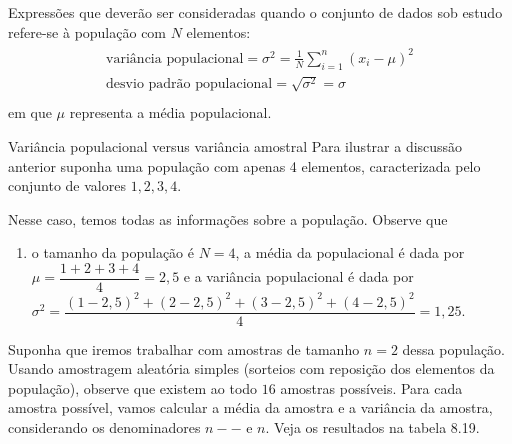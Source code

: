 {{{Expressões que deverão ser consideradas quando o conjunto de dados sob estudo refere-se à população com \(N\) elementos:
\begin{align*}\!\begin{aligned}
\text{variância populacional} = \sigma^2=\frac{1}{N}\sum^n_{i=1}(x_i-\mu)^2\\
\text{desvio padrão populacional}=\sqrt{\sigma^2}=\sigma\\
\end{aligned}\end{align*}
em que \(\mu\) representa a média populacional.


\needspace{.25\textheight}
\begin{example}{Variância populacional versus variância amostral}
Para ilustrar a discussão anterior suponha uma população com apenas 4 elementos, caracterizada pelo conjunto de valores ${1,2,3,4}$.

Nesse caso, temos todas as informações sobre a população. Observe que

\begin{enumerate}
\item o tamanho da população é $N=4$,
a média da populacional é dada por $\mu=\dfrac{1+2+3+4}{4}=2,5$ e
a variância populacional é dada por $\sigma^2=\dfrac{(1-2{,}5)^2+(2-2{,}5)^2+(3-2{,}5)^2+(4-2{,}5)^2}{4}=1{,}25$.
\end{enumerate}

Suponha que iremos trabalhar com amostras de tamanho $n=2$ dessa população. Usando amostragem aleatória simples (sorteios com reposição dos elementos da população), observe que existem ao todo $16$ amostras possíveis. Para cada amostra possível, vamos calcular a média da amostra e a variância da amostra, considerando os denominadores $n--$ e $n$. Veja os resultados na tabela 8.19.

\begin{table}[H]
\centering


\end{table}
\end{example}}}}
